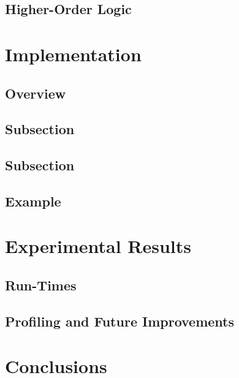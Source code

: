 \documentclass{llncs}
\begin{document}
\subsection{Higher-Order Logic}
\label{sec:hol}


\section{Implementation}
\label{sec:checking}

\subsection{Overview}
\label{sec:checking-overview}

\subsection{Subsection}
\label{sec:preproc}

\subsection{Subsection}
\label{sec:hypelim}

\subsection{Example}


\section{Experimental Results}
\label{sec:experimental-results}

\subsection{Run-Times}
\label{sec:run-times}

\subsection{Profiling and Future Improvements}


\section{Conclusions}
\label{sec:conclusion}
\end{document}
